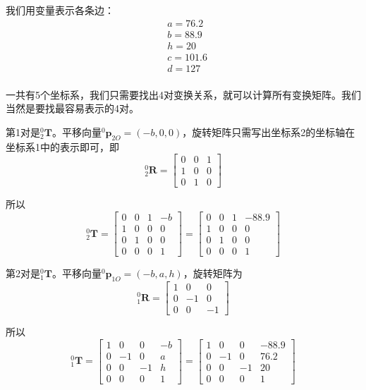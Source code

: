 \documentclass{homework}
\begin{document}
\begin{sol}

  我们用变量表示各条边：
  \begin{align*}
    & a = 76.2 \\
    & b = 88.9 \\
    & h = 20 \\
    & c = 101.6 \\
    & d = 127 \\
  \end{align*}

  一共有5个坐标系，我们只需要找出4对变换关系，就可以计算所有变换矩阵。我们当然是要找最容易表示的4对。

  第1对是$ _2^0\mathbf{T} $。平移向量$ ^0\mathbf{p}_{2O} = (-b, 0, 0) $，旋转矩阵只需写出坐标系2的坐标轴在坐标系1中的表示即可，即
  \[
    _2^0\mathbf{R} = 
    \begin{bmatrix}
      0 & 0 & 1 \\
      1 & 0 & 0 \\
      0 & 1 & 0 
    \end{bmatrix}
  \]

  所以
  \[
    _2^0\mathbf{T} = 
    \begin{bmatrix}
      0 & 0 & 1 & -b \\
      1 & 0 & 0 & 0 \\
      0 & 1 & 0 & 0 \\
      0 & 0 & 0 & 1
    \end{bmatrix} =
    \begin{bmatrix}
      0 & 0 & 1 & -88.9 \\
      1 & 0 & 0 & 0 \\
      0 & 1 & 0 & 0 \\
      0 & 0 & 0 & 1
    \end{bmatrix}
  \]

  第2对是$ _1^0\mathbf{T} $。平移向量$ ^0\mathbf{p}_{1O} = (-b, a, h) $，旋转矩阵为
  \[
    _1^0\mathbf{R} = 
    \begin{bmatrix}
      1 & 0 & 0 \\
      0 & -1 & 0 \\
      0 & 0 & -1 
    \end{bmatrix}
  \]

  所以
  \[
    _1^0\mathbf{T} = 
    \begin{bmatrix}
      1 & 0 & 0 & -b \\
      0 & -1 & 0 & a \\
      0 & 0 & -1 & h \\
      0 & 0 & 0 & 1
    \end{bmatrix} =
    \begin{bmatrix}
      1 & 0 & 0 & -88.9 \\
      0 & -1 & 0 & 76.2 \\
      0 & 0 & -1 & 20 \\
      0 & 0 & 0 & 1
    \end{bmatrix}
  \]


\end{sol}
\end{document}

